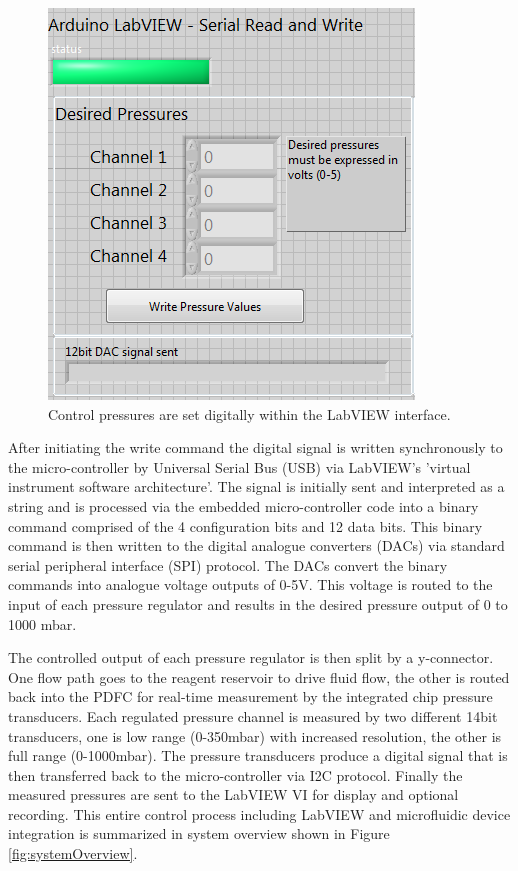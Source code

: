 \begin{figure}[H]
\centering 
\includegraphics[width=0.5\columnwidth]{writeVI.PNG} 
\caption[LabVIEW write command]{Control pressures are set digitally within the LabVIEW interface.} 
\label{fig:writeVI} 
\end{figure}

After initiating the write command the digital signal is written synchronously to the micro-controller by Universal Serial Bus (USB) via LabVIEW's 'virtual instrument software architecture'. The signal is initially sent and interpreted as a string and is processed via the embedded micro-controller code into a binary command comprised of the 4 configuration bits and 12 data bits. This binary command is then written to the digital analogue converters (DACs) via standard serial peripheral  interface (SPI) protocol. The DACs convert the binary commands into analogue voltage outputs of 0-5V. This voltage is routed to the input of each pressure regulator and results in the desired pressure output of 0 to 1000 mbar.

The controlled output of each pressure regulator is then split by a y-connector. One flow path goes to the reagent reservoir to drive fluid flow, the other is routed back into the PDFC for real-time measurement by the integrated chip pressure transducers. Each regulated pressure channel is measured by two different 14bit transducers, one is low range (0-350mbar) with increased resolution, the other is full range (0-1000mbar). The pressure transducers produce a digital signal that is then transferred back to the micro-controller via I2C protocol. Finally the measured pressures are sent to the LabVIEW VI for display and optional recording. This entire control process including LabVIEW and microfluidic device integration is summarized in system overview shown in Figure \vref{fig:systemOverview}.



